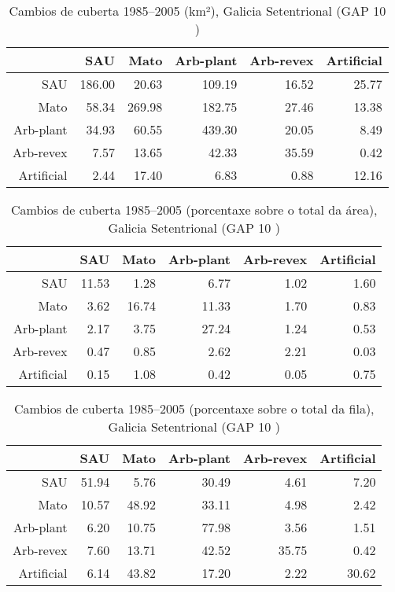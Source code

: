 \clearpage
\begin{table}[p]
\centering
\caption{Cambios de cuberta 1985--2005 (km²), Galicia Setentrional (GAP 10 )} 
\label{TaboaContinxGAP10}
\begin{tabular}{rrrrrr}
  \hline
 & SAU & Mato & Arb-plant & Arb-revex & Artificial \\ 
  \hline
SAU & 186.00 & 20.63 & 109.19 & 16.52 & 25.77 \\ 
  Mato & 58.34 & 269.98 & 182.75 & 27.46 & 13.38 \\ 
  Arb-plant & 34.93 & 60.55 & 439.30 & 20.05 & 8.49 \\ 
  Arb-revex & 7.57 & 13.65 & 42.33 & 35.59 & 0.42 \\ 
  Artificial & 2.44 & 17.40 & 6.83 & 0.88 & 12.16 \\ 
   \hline
\end{tabular}
\end{table}
\begin{table}[p]
\centering
\caption{Cambios de cuberta 1985--2005 (porcentaxe sobre o total da área), Galicia Setentrional (GAP 10 )} 
\label{TaboaContinxPTGAP10}
\begin{tabular}{rrrrrr}
  \hline
 & SAU & Mato & Arb-plant & Arb-revex & Artificial \\ 
  \hline
SAU & 11.53 & 1.28 & 6.77 & 1.02 & 1.60 \\ 
  Mato & 3.62 & 16.74 & 11.33 & 1.70 & 0.83 \\ 
  Arb-plant & 2.17 & 3.75 & 27.24 & 1.24 & 0.53 \\ 
  Arb-revex & 0.47 & 0.85 & 2.62 & 2.21 & 0.03 \\ 
  Artificial & 0.15 & 1.08 & 0.42 & 0.05 & 0.75 \\ 
   \hline
\end{tabular}
\end{table}
\begin{table}[p]
\centering
\caption{Cambios de cuberta 1985--2005 (porcentaxe sobre o total da fila), Galicia Setentrional (GAP 10 )} 
\label{TaboaContinxPFGAP10}
\begin{tabular}{rrrrrr}
  \hline
 & SAU & Mato & Arb-plant & Arb-revex & Artificial \\ 
  \hline
SAU & 51.94 & 5.76 & 30.49 & 4.61 & 7.20 \\ 
  Mato & 10.57 & 48.92 & 33.11 & 4.98 & 2.42 \\ 
  Arb-plant & 6.20 & 10.75 & 77.98 & 3.56 & 1.51 \\ 
  Arb-revex & 7.60 & 13.71 & 42.52 & 35.75 & 0.42 \\ 
  Artificial & 6.14 & 43.82 & 17.20 & 2.22 & 30.62 \\ 
   \hline
\end{tabular}
\end{table}
